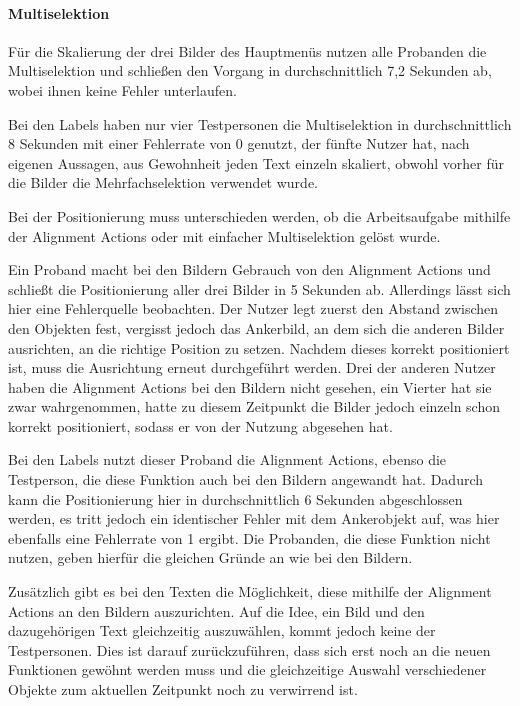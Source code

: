 \paragraph{Multiselektion}
Für die Skalierung der drei Bilder des Hauptmenüs nutzen alle Probanden die Multiselektion und schließen den Vorgang in durchschnittlich 7,2 Sekunden ab, wobei ihnen keine Fehler unterlaufen.

Bei den Labels haben nur vier Testpersonen die Multiselektion in durchschnittlich 8 Sekunden mit einer Fehlerrate von 0 genutzt, der fünfte Nutzer hat, nach eigenen Aussagen, aus Gewohnheit jeden Text einzeln skaliert, obwohl vorher für die Bilder die Mehrfachselektion verwendet wurde.

Bei der Positionierung muss unterschieden werden, ob die Arbeitsaufgabe mithilfe der Alignment Actions oder mit einfacher Multiselektion gelöst wurde.

Ein Proband macht bei den Bildern Gebrauch von den Alignment Actions und schließt die Positionierung aller drei Bilder in 5 Sekunden ab.
Allerdings lässt sich hier eine Fehlerquelle beobachten.
Der Nutzer legt zuerst den Abstand zwischen den Objekten fest, vergisst jedoch das Ankerbild, an dem sich die anderen Bilder ausrichten, an die richtige Position zu setzen.
Nachdem dieses korrekt positioniert ist, muss die Ausrichtung erneut durchgeführt werden.
Drei der anderen Nutzer haben die Alignment Actions bei den Bildern nicht gesehen, ein Vierter hat sie zwar wahrgenommen, hatte zu diesem Zeitpunkt die Bilder jedoch einzeln schon korrekt positioniert, sodass er von der Nutzung abgesehen hat.

Bei den Labels nutzt dieser Proband die Alignment Actions, ebenso die Testperson, die diese Funktion auch bei den Bildern angewandt hat.
Dadurch kann die Positionierung hier in durchschnittlich 6 Sekunden abgeschlossen werden, es tritt jedoch ein identischer Fehler mit dem Ankerobjekt auf, was hier ebenfalls eine Fehlerrate von 1 ergibt.
Die Probanden, die diese Funktion nicht nutzen, geben hierfür die gleichen Gründe an wie bei den Bildern.

Zusätzlich gibt es bei den Texten die Möglichkeit, diese mithilfe der Alignment Actions an den Bildern auszurichten.
Auf die Idee, ein Bild und den dazugehörigen Text gleichzeitig auszuwählen, kommt jedoch keine der Testpersonen.
Dies ist darauf zurückzuführen, dass sich erst noch an die neuen Funktionen gewöhnt werden muss und die gleichzeitige Auswahl verschiedener Objekte zum aktuellen Zeitpunkt noch zu verwirrend ist.

